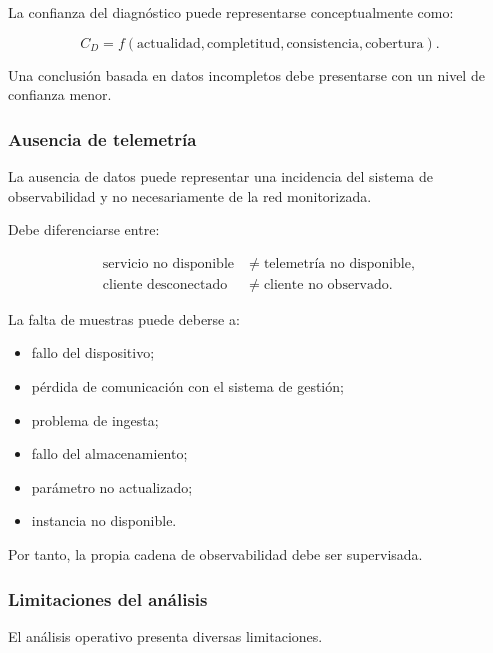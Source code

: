 La confianza del diagnóstico puede representarse conceptualmente como:

\[
    C_D
    =
    f
    \left(
        \text{actualidad},
        \text{completitud},
        \text{consistencia},
        \text{cobertura}
    \right).
\]

Una conclusión basada en datos incompletos debe presentarse con un nivel
de confianza menor.


\subsubsection*{Ausencia de telemetría}

La ausencia de datos puede representar una incidencia del sistema de
observabilidad y no necesariamente de la red monitorizada.

Debe diferenciarse entre:

\[
\begin{aligned}
    \text{servicio no disponible}
    &\neq
    \text{telemetría no disponible},\\
    \text{cliente desconectado}
    &\neq
    \text{cliente no observado}.
\end{aligned}
\]

La falta de muestras puede deberse a:

\begin{itemize}
    \item fallo del dispositivo;

    \item pérdida de comunicación con el sistema de gestión;

    \item problema de ingesta;

    \item fallo del almacenamiento;

    \item parámetro no actualizado;

    \item instancia no disponible.
\end{itemize}

Por tanto, la propia cadena de observabilidad debe ser supervisada.


\subsubsection*{Limitaciones del análisis}

El análisis operativo presenta diversas limitaciones.

